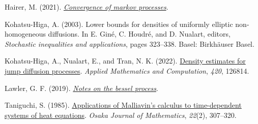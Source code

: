 \documentclass[
]{article}
\newlength{\cslhangindent}
\newenvironment{CSLReferences}[2] %
 {\begin{list}{}{%
  \setlength{\itemindent}{0pt}
  \setlength{\leftmargin}{0pt}
  \setlength{\parsep}{0pt}
  \ifodd #1
   \setlength{\leftmargin}{\cslhangindent}
   \setlength{\itemindent}{-1\cslhangindent}
  \fi
  \setlength{\itemsep}{#2\baselineskip}}}
 {\end{list}}
\begin{document}
\label{refs}
\begin{CSLReferences}{1}{1}
Hairer, M. (2021).
\emph{\href{https://www.hairer.org/notes/Convergence.pdf}{Convergence of
markov processes}}.

Kohatsu-Higa, A. (2003). Lower bounds for densities of uniformly
elliptic non-homogeneous diffusions. In E. Giné, C. Houdré, and D.
Nualart, editors, \emph{Stochastic inequalities and applications}, pages
323--338. Basel: Birkh{ä}user Basel.

Kohatsu-Higa, A., Nualart, E., and Tran, N. K. (2022).
\href{https://doi.org/10.1016/j.amc.2021.126814}{Density estimates for
jump diffusion processes}. \emph{Applied Mathematics and Computation},
\emph{420}, 126814.

Lawler, G. F. (2019).
\emph{\href{https://www.math.uchicago.edu/~lawler/bessel18new.pdf}{Notes
on the bessel process}}.

Taniguchi, S. (1985).
\href{https://projecteuclid.org/journals/osaka-journal-of-mathematics/volume-22/issue-2/Applications-of-Malliavins-calculus-to-time-dependent-systems-of-heat/ojm/1200778261.full}{{Applications
of Malliavin's calculus to time-dependent systems of heat equations}}.
\emph{Osaka Journal of Mathematics}, \emph{22}(2), 307--320.

\end{CSLReferences}
\end{document}
